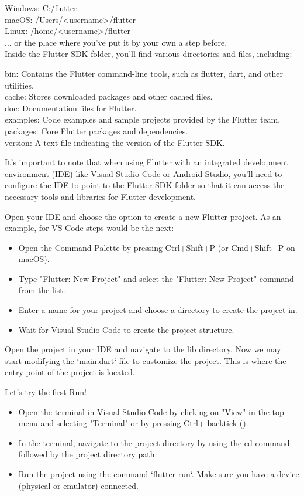 \noindent Windows: C:/flutter\\
macOS: /Users/<username>/flutter\\
Linux: /home/<username>/flutter\\
... or the place where you've put it by your own a step before.
\\
\noindent Inside the Flutter SDK folder, you'll find various directories and files, including:

\noindent bin: Contains the Flutter command-line tools, such as flutter, dart, and other utilities.\\
cache: Stores downloaded packages and other cached files.\\
doc: Documentation files for Flutter.\\
examples: Code examples and sample projects provided by the Flutter team.\\
packages: Core Flutter packages and dependencies.\\
version: A text file indicating the version of the Flutter SDK.

It's important to note that when using Flutter with an integrated development environment (IDE) 
like Visual Studio Code or Android Studio, you'll need to configure the IDE to point to the Flutter 
SDK folder so that it can access the necessary tools and libraries for Flutter development.

Open your IDE and choose the option to create a new Flutter project. As an example, for VS Code steps would be 
the next:
\begin{itemize}
    \item Open the Command Palette by pressing Ctrl+Shift+P (or Cmd+Shift+P on macOS).
    \item Type "Flutter: New Project" and select the "Flutter: New Project" command from the list.
    \item Enter a name for your project and choose a directory to create the project in.
    \item Wait for Visual Studio Code to create the project structure.
\end{itemize}

Open the project in your IDE and navigate to the lib directory.
Now we may start modifying the `main.dart` file to customize the project. This is where the entry point of the project
is located.


\noindent Let's try the first Run!
\begin{itemize}
    \item Open the terminal in Visual Studio Code by clicking on "View" in the top menu and selecting "Terminal" 
    or by pressing Ctrl+ backtick ().
    \item In the terminal, navigate to the project directory by using the cd command followed by the project 
    directory path.
    \item Run the project using the command `flutter run`. Make sure you have a device (physical or emulator) 
    connected.
\end{itemize}

